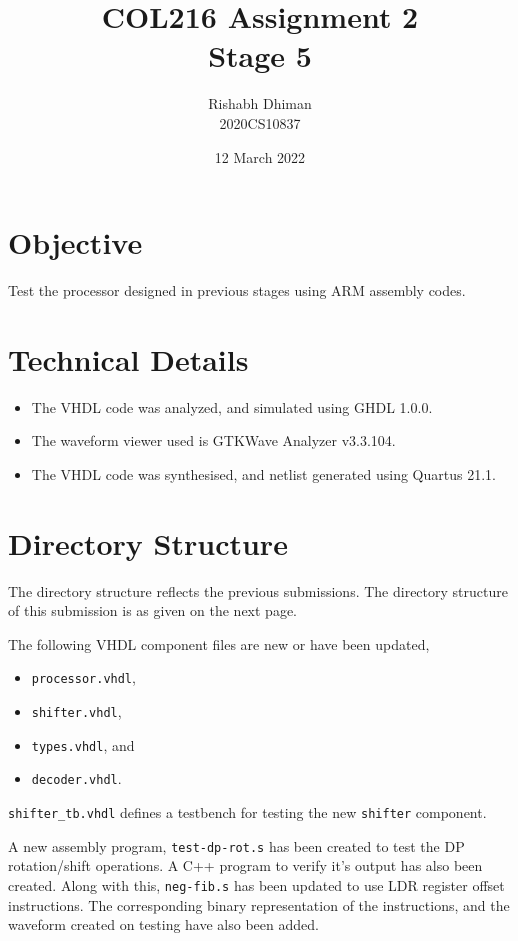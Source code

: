 \documentclass[a4paper]{scrartcl}
\title{COL216 Assignment 2\\{\Large Stage 5}}
\date{12 March 2022}
\author{Rishabh Dhiman\\ 2020CS10837}
\renewcommand{\tt}{\texttt}
\begin{document}
\maketitle

\section{Objective}
Test the processor designed in previous stages using ARM assembly codes.

\section{Technical Details}
\begin{itemize}
	\item The VHDL code was analyzed, and simulated using GHDL 1.0.0.
	\item The waveform viewer used is GTKWave Analyzer v3.3.104.
    \item The VHDL code was synthesised, and netlist generated using Quartus 21.1.
\end{itemize}

\section{Directory Structure}
The directory structure reflects the previous submissions.
The directory structure of this submission is as given on the next page.

The following VHDL component files are new or have been updated,
\begin{multicols}{4}
    \begin{itemize}
        \item \tt{processor.vhdl},
        \item \tt{shifter.vhdl},
        \item \tt{types.vhdl}, and
        \item \tt{decoder.vhdl}.
    \end{itemize}
\end{multicols}
\tt{shifter_tb.vhdl} defines a testbench for testing the new \tt{shifter} component.

A new assembly program, \tt{test-dp-rot.s} has been created to test the DP rotation/shift operations. A C++ program to verify it's output has also been created.
Along with this, \tt{neg-fib.s} has been updated to use LDR register offset instructions. The corresponding binary representation of the instructions, and the waveform created on testing have also been added.
\end{document}
